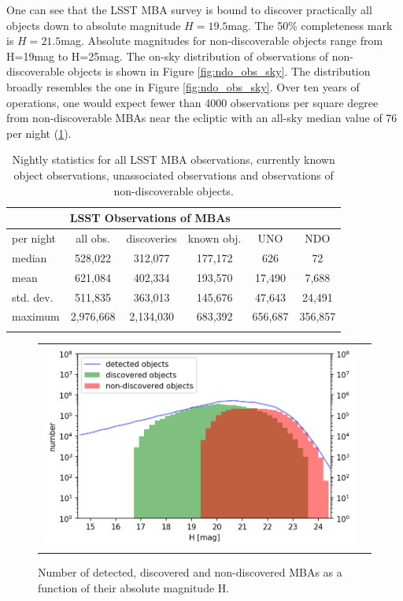One can see that the \gls{LSST} \gls{MBA} survey is bound to discover practically all objects down to absolute magnitude $H=19.5$mag. The 50\% completeness mark is $H=21.5$mag.
Absolute magnitudes for non-discoverable objects range from H=19mag to H=25mag.
The on-sky distribution of observations of non-discoverable objects is shown in Figure \ref{fig:ndo_obs_sky}. The distribution broadly resembles the one in Figure \ref{fig:ndo_obs_sky}. Over ten years of operations, one would expect fewer than 4000 observations per square degree from non-discoverable MBAs near the ecliptic with an all-sky median value of 76 per night (\ref{tab:obs_stats}).   
%
\begin{table}[tb!]
\begin{center}
\begin{tabular}{lccccc}
\multicolumn{5}{c}{LSST Observations of MBAs}\\
\hline\hline
per night & all obs. & discoveries & known obj. & \gls{UNO} & \gls{NDO} \\\hline
median  & 528,022 &312,077  &177,172 &626 &72 \\
mean & 621,084 & 402,334 & 193,570 & 17,490 & 7,688 \\
std. dev. & 511,835 & 363,013& 145,676 &47,643 & 24,491\\
maximum & 2,976,668 & 2,134,030 & 683,392 & 656,687 & 356,857\\
\hline\hline\\
\end{tabular}
\end{center}
\caption{Nightly statistics for all \gls{LSST} \gls{MBA} observations, currently known object observations, unassociated observations and observations of
non-discoverable objects.}
\label{tab:obs_stats}
\end{table}
%

\begin{figure}[tb!]
\begin{center}
\begin{tabular}{cc}
\includegraphics[width=0.70\linewidth]{figs/detection_discovered2.png}
\end{tabular}
\end{center}
\caption{Number of detected, discovered and non-discovered MBAs as a function of their absolute magnitude H. }
\label{fig:ndo_h}       %
\end{figure}

